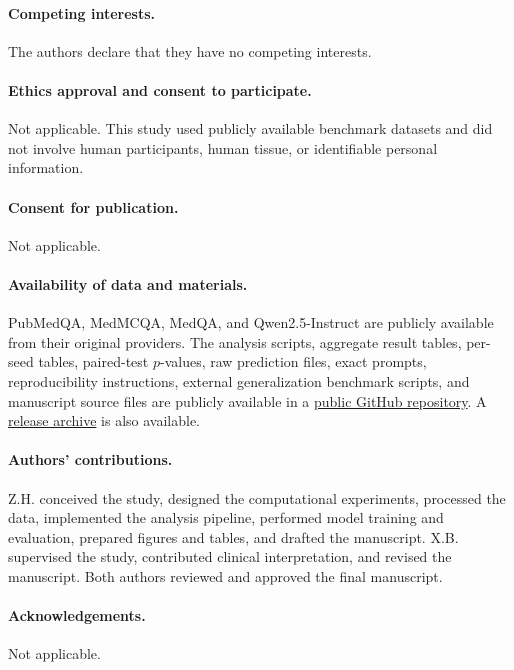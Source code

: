 \documentclass[11pt]{article}
\begin{document}
\paragraph{Competing interests.}
The authors declare that they have no competing interests.

\paragraph{Ethics approval and consent to participate.}
Not applicable. This study used publicly available benchmark datasets and did not involve human participants, human tissue, or identifiable personal information.

\paragraph{Consent for publication.}
Not applicable.

\paragraph{Availability of data and materials.}
PubMedQA, MedMCQA, MedQA, and Qwen2.5-Instruct are publicly available from their original providers. The analysis scripts, aggregate result tables, per-seed tables, paired-test $p$-values, raw prediction files, exact prompts, reproducibility instructions, external generalization benchmark scripts, and manuscript source files are publicly available in a \href{https://github.com/123hzq321/collapse-aware-medical-lora-adaptation}{public GitHub repository}. A \href{https://github.com/123hzq321/collapse-aware-medical-lora-adaptation/releases/tag/v0.2-external-benchmarks}{release archive} is also available.

\paragraph{Authors' contributions.}
Z.H. conceived the study, designed the computational experiments, processed the data, implemented the analysis pipeline, performed model training and evaluation, prepared figures and tables, and drafted the manuscript. X.B. supervised the study, contributed clinical interpretation, and revised the manuscript. Both authors reviewed and approved the final manuscript.

\paragraph{Acknowledgements.}
Not applicable.
\end{document}

